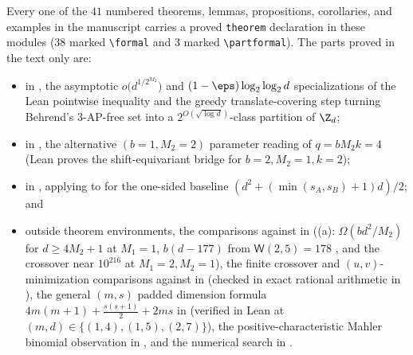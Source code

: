 Every one of the $41$ numbered theorems, lemmas, propositions, corollaries, and examples in the
manuscript carries a proved \texttt{theorem} declaration in these modules ($38$ marked \verb|\formal|
and $3$ marked \verb|\partformal|). The parts proved in the text only are:
\begin{itemize}[leftmargin=1.5em]
\item in , the asymptotic $o\bigl(d^{1/2^{M_2}}\bigr)$ and $(1 - \eps)\log_2\log_2 d$
  specializations of the Lean pointwise inequality and the greedy translate-covering step turning
  Behrend's $3$-AP-free set \cite{Behrend1946} into a $2^{O(\sqrt{\log d})}$-class partition of $\Z_d$;
\item in , the alternative $(b = 1, M_2 = 2)$ parameter reading of $q = b M_2 k = 4$
  (Lean proves the shift-equivariant  bridge for
  $b = 2, M_2 = 1, k = 2$);
\item in , applying \cite[Theorem~6.4]{SeventeenthPaper2026} to
   for the one-sided baseline $(d^2 + (\min(s_A, s_B) + 1)d)/2$; and
\item outside theorem environments, the comparisons against \cite[Theorem~6.6]{SharedDecoders2026}
  in  ((a): $\Omega(bd^2/M_2)$ for $d \ge 4M_2 + 1$ at
  $M_1 = 1$, $b(d - 177)$ from $\mathsf{W}(2, 5) = 178$ \cite{StevensShantaram1978}, and the
  crossover near $10^{216}$ at $M_1 = 2, M_2 = 1$), the finite crossover and $(u,v)$-minimization
  comparisons against
  \cite[Theorem~3.5]{SharedDecoders2026} in  (checked in exact rational
  arithmetic in ), the general $(m, s)$ padded
  dimension formula
  $4m(m+1) + \frac{s(s+1)}{2} + 2ms$ in  (verified in Lean at $(m, d) \in
  \{(1,4), (1,5), (2,7)\}$), the positive-characteristic Mahler binomial observation in
  , and the numerical search in .
\end{itemize}
